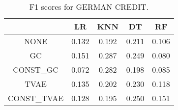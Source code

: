 \begin{table}
\caption{F1 scores for GERMAN CREDIT.}
\label{tab:f1-GERMAN CREDIT}
\begin{tabular}{ccccc}
\toprule
 & LR & KNN & DT & RF \\
\midrule
NONE & 0.132 & 0.192 & 0.211 & 0.106 \\
GC & 0.151 & 0.287 & 0.249 & 0.080 \\
CONST\_GC & 0.072 & 0.282 & 0.198 & 0.085 \\
TVAE & 0.135 & 0.202 & 0.230 & 0.118 \\
CONST\_TVAE & 0.128 & 0.195 & 0.250 & 0.151 \\
\bottomrule
\end{tabular}
\end{table}

